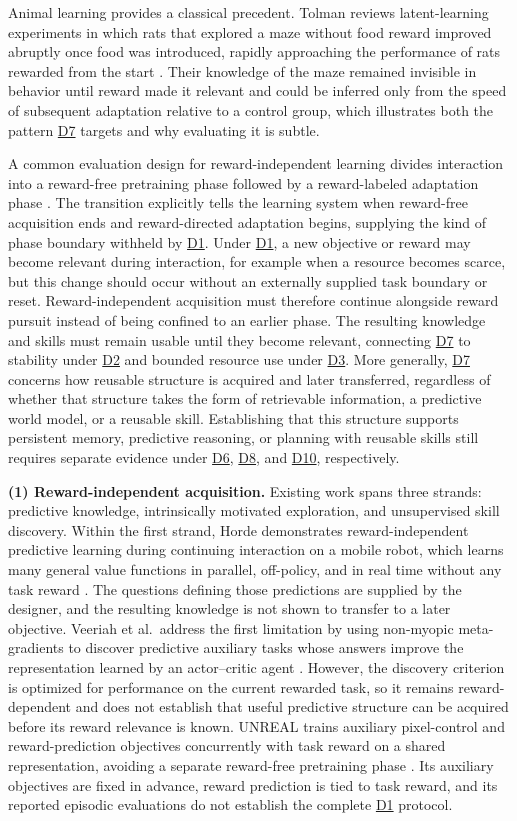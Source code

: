 \documentclass[10pt,journal,compsoc]{IEEEtran}
\DeclareRobustCommand{\Dref}[1]{\hyperref[sec:d#1]{D#1}}
\begin{document}
Animal learning provides a classical precedent.
Tolman reviews latent-learning experiments in which rats that explored a maze without food reward improved abruptly once food was introduced, rapidly approaching the performance of rats rewarded from the start \cite{tolman1948}.
Their knowledge of the maze remained invisible in behavior until reward made it relevant and could be inferred only from the speed of subsequent adaptation relative to a control group, which illustrates both the pattern \Dref{7} targets and why evaluating it is subtle.

A common evaluation design for reward-independent learning divides interaction into a reward-free pretraining phase followed by a reward-labeled adaptation phase \cite{jin2020,sekar2020,laskin2021}.
The transition explicitly tells the learning system when reward-free acquisition ends and reward-directed adaptation begins, supplying the kind of phase boundary withheld by \Dref{1}.
Under \Dref{1}, a new objective or reward may become relevant during interaction, for example when a resource becomes scarce, but this change should occur without an externally supplied task boundary or reset.
Reward-independent acquisition must therefore continue alongside reward pursuit instead of being confined to an earlier phase.
The resulting knowledge and skills must remain usable until they become relevant, connecting \Dref{7} to stability under \Dref{2} and bounded resource use under \Dref{3}.
More generally, \Dref{7} concerns how reusable structure is acquired and later transferred, regardless of whether that structure takes the form of retrievable information, a predictive world model, or a reusable skill.
Establishing that this structure supports persistent memory, predictive reasoning, or planning with reusable skills still requires separate evidence under \Dref{6}, \Dref{8}, and \Dref{10}, respectively.

\noindent\textbf{(1) Reward-independent acquisition.}
Existing work spans three strands: predictive knowledge, intrinsically motivated exploration, and unsupervised skill discovery.
Within the first strand, Horde demonstrates reward-independent predictive learning during continuing interaction on a mobile robot, which learns many general value functions in parallel, off-policy, and in real time without any task reward \cite{sutton2011}.
The questions defining those predictions are supplied by the designer, and the resulting knowledge is not shown to transfer to a later objective.
Veeriah et al.\ address the first limitation by using non-myopic meta-gradients to discover predictive auxiliary tasks whose answers improve the representation learned by an actor--critic agent \cite{veeriah2019}.
However, the discovery criterion is optimized for performance on the current rewarded task, so it remains reward-dependent and does not establish that useful predictive structure can be acquired before its reward relevance is known.
UNREAL trains auxiliary pixel-control and reward-prediction objectives concurrently with task reward on a shared representation, avoiding a separate reward-free pretraining phase \cite{jaderberg2017}.
Its auxiliary objectives are fixed in advance, reward prediction is tied to task reward, and its reported episodic evaluations do not establish the complete \Dref{1} protocol.
\end{document}

